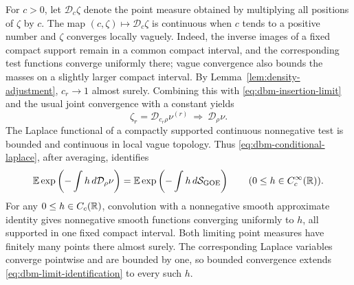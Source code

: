 For \(c>0\), let \(\mathcal D_c\zeta\) denote the point measure
obtained by multiplying all positions of \(\zeta\) by \(c\).
The map \((c,\zeta)\mapsto\mathcal D_c\zeta\) is continuous when
\(c\) tends to a positive number and \(\zeta\) converges locally
vaguely. Indeed, the inverse images of a fixed compact support
remain in a common compact interval, and the corresponding test
functions converge uniformly there; vague convergence also bounds
the masses on a slightly larger compact interval.
By Lemma~\ref{lem:density-adjustment}, \(c_r\to1\) almost surely.
Combining this with \eqref{eq:dbm-insertion-limit} and the usual
joint convergence with a constant yields
\[
 \zeta_r=\mathcal D_{c_r\rho}\nu^{(r)}
       \ \Longrightarrow\ \mathcal D_\rho\nu.
\]
The Laplace functional of a compactly supported continuous
nonnegative test is bounded and continuous in local vague topology.
Thus \eqref{eq:dbm-conditional-laplace}, after averaging, identifies
\begin{equation}
 \label{eq:dbm-limit-identification}
 \mathbb E\exp\left(-\int h\,d\mathcal D_\rho\nu\right)
   =\mathbb E\exp\left(-\int h\,d\mathcal S_{\mathrm{GOE}}\right)
 \qquad (0\le h\in C_c^\infty(\mathbb R)).
\end{equation}
For any \(0\le h\in C_c(\mathbb R)\), convolution with a nonnegative
smooth approximate identity gives nonnegative smooth functions
converging uniformly to \(h\), all supported in one fixed compact
interval. Both limiting point measures have finitely many points
there almost surely. The corresponding Laplace variables converge
pointwise and are bounded by one, so bounded convergence extends
\eqref{eq:dbm-limit-identification} to every such \(h\).


